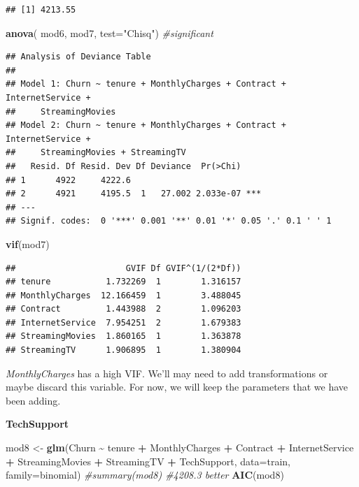 \documentclass[
  twoside]{article}
\newenvironment{Shaded}{\begin{snugshade}}{\end{snugshade}}
\newcommand{\AttributeTok}[1]{\textcolor[rgb]{0.13,0.29,0.53}{#1}}
\newcommand{\CommentTok}[1]{\textcolor[rgb]{0.56,0.35,0.01}{\textit{#1}}}
\newcommand{\FunctionTok}[1]{\textcolor[rgb]{0.13,0.29,0.53}{\textbf{#1}}}
\newcommand{\NormalTok}[1]{#1}
\newcommand{\OtherTok}[1]{\textcolor[rgb]{0.56,0.35,0.01}{#1}}
\newcommand{\SpecialCharTok}[1]{\textcolor[rgb]{0.81,0.36,0.00}{\textbf{#1}}}
\newcommand{\StringTok}[1]{\textcolor[rgb]{0.31,0.60,0.02}{#1}}
\begin{document}
\begin{verbatim}
## [1] 4213.55
\end{verbatim}

\begin{Shaded}
\begin{Highlighting}[]
\FunctionTok{anova}\NormalTok{( mod6, mod7,  }\AttributeTok{test=}\StringTok{"Chisq"}\NormalTok{) }\CommentTok{\#significant}
\end{Highlighting}
\end{Shaded}

\begin{verbatim}
## Analysis of Deviance Table
## 
## Model 1: Churn ~ tenure + MonthlyCharges + Contract + InternetService + 
##     StreamingMovies
## Model 2: Churn ~ tenure + MonthlyCharges + Contract + InternetService + 
##     StreamingMovies + StreamingTV
##   Resid. Df Resid. Dev Df Deviance  Pr(>Chi)    
## 1      4922     4222.6                          
## 2      4921     4195.5  1   27.002 2.033e-07 ***
## ---
## Signif. codes:  0 '***' 0.001 '**' 0.01 '*' 0.05 '.' 0.1 ' ' 1
\end{verbatim}

\begin{Shaded}
\begin{Highlighting}[]
\FunctionTok{vif}\NormalTok{(mod7)}
\end{Highlighting}
\end{Shaded}

\begin{verbatim}
##                      GVIF Df GVIF^(1/(2*Df))
## tenure           1.732269  1        1.316157
## MonthlyCharges  12.166459  1        3.488045
## Contract         1.443988  2        1.096203
## InternetService  7.954251  2        1.679383
## StreamingMovies  1.860165  1        1.363878
## StreamingTV      1.906895  1        1.380904
\end{verbatim}

\emph{MonthlyCharges} has a high VIF. We'll may need to add
transformations or maybe discard this variable. For now, we will keep
the parameters that we have been adding.

\textbf{TechSupport}

\begin{Shaded}
\begin{Highlighting}[]
\NormalTok{mod8 }\OtherTok{\textless{}{-}} \FunctionTok{glm}\NormalTok{(Churn }\SpecialCharTok{\textasciitilde{}}\NormalTok{ tenure }\SpecialCharTok{+}\NormalTok{ MonthlyCharges }\SpecialCharTok{+}\NormalTok{ Contract }\SpecialCharTok{+}\NormalTok{ InternetService }\SpecialCharTok{+} 
\NormalTok{      StreamingMovies }\SpecialCharTok{+}\NormalTok{ StreamingTV }\SpecialCharTok{+}\NormalTok{ TechSupport, }\AttributeTok{data=}\NormalTok{train, }\AttributeTok{family=}\NormalTok{binomial)}
\CommentTok{\#summary(mod8) \#4208.3 better}
\FunctionTok{AIC}\NormalTok{(mod8)}
\end{Highlighting}
\end{Shaded}
\end{document}
